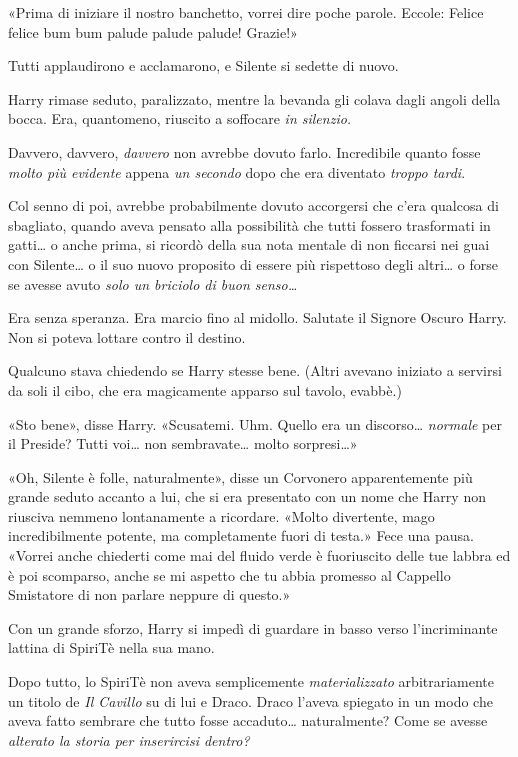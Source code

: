 «Prima di iniziare il nostro banchetto, vorrei dire poche parole. Eccole: Felice felice bum bum palude palude palude! Grazie!»

Tutti applaudirono e acclamarono, e Silente si sedette di nuovo.

Harry rimase seduto, paralizzato, mentre la bevanda gli colava dagli angoli della bocca. Era, quantomeno, riuscito a soffocare \textit{in silenzio.}

Davvero, davvero, \textit{davvero} non avrebbe dovuto farlo. Incredibile quanto fosse \textit{molto più evidente} appena \textit{un secondo} dopo che era diventato \textit{troppo tardi}.

Col senno di poi, avrebbe probabilmente dovuto accorgersi che c’era qualcosa di sbagliato, quando aveva pensato alla possibilità che tutti fossero trasformati in gatti… o anche prima, si ricordò della sua nota mentale di non ficcarsi nei guai con Silente… o il suo nuovo proposito di essere più rispettoso degli altri… o forse se avesse avuto \textit{solo un briciolo di buon senso…}

Era senza speranza. Era marcio fino al midollo. Salutate il Signore Oscuro Harry. Non si poteva lottare contro il destino.

Qualcuno stava chiedendo se Harry stesse bene. (Altri avevano iniziato a servirsi da soli il cibo, che era magicamente apparso sul tavolo, evabbè.)

«Sto bene», disse Harry. «Scusatemi. Uhm. Quello era un discorso… \textit{normale} per il Preside? Tutti voi… non sembravate… molto sorpresi…»

«Oh, Silente è folle, naturalmente», disse un Corvonero apparentemente più grande seduto accanto a lui, che si era presentato con un nome che Harry non riusciva nemmeno lontanamente a ricordare. «Molto divertente, mago incredibilmente potente, ma completamente fuori di testa.» Fece una pausa. «Vorrei anche chiederti come mai del fluido verde è fuoriuscito delle tue labbra ed è poi scomparso, anche se mi aspetto che tu abbia promesso al Cappello Smistatore di non parlare neppure di questo.»

Con un grande sforzo, Harry si impedì di guardare in basso verso l’incriminante lattina di SpiriTè nella sua mano.

Dopo tutto, lo SpiriTè non aveva semplicemente \textit{materializzato} arbitrariamente un titolo de \textit{Il Cavillo} su di lui e Draco. Draco l’aveva spiegato in un modo che aveva fatto sembrare che tutto fosse accaduto… naturalmente? Come se avesse \textit{alterato la storia per inserircisi dentro?}

